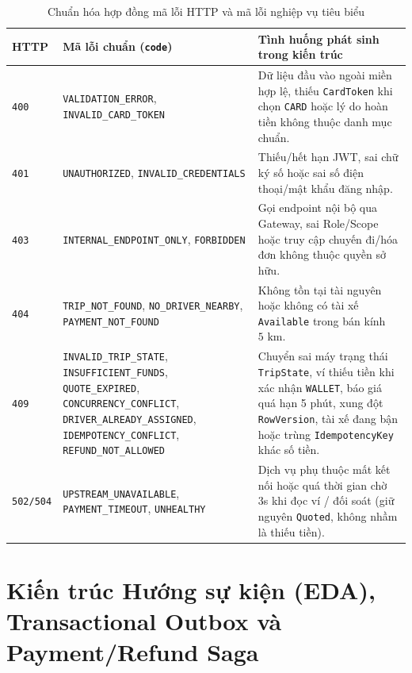 \documentclass[12pt,a4paper]{article}
\newcommand{\ab}{\allowbreak}
\begin{document}
{\footnotesize
\renewcommand{\arraystretch}{1.20}
\begin{table}[htbp]
\centering
\caption{Chuẩn hóa hợp đồng mã lỗi HTTP và mã lỗi nghiệp vụ tiêu biểu}
\label{tab:error-codes}
\begin{tabularx}{\textwidth}{C{1.4cm} L{4.9cm} Y}
\toprule
\textbf{HTTP} & \textbf{Mã lỗi chuẩn (\texttt{code})} & \textbf{Tình huống phát sinh trong kiến trúc} \\
\midrule
\texttt{400} & \texttt{VALIDATION\_ERROR}, \texttt{INVALID\_CARD\_TOKEN} & Dữ liệu đầu vào ngoài miền hợp lệ, thiếu \texttt{CardToken} khi chọn \texttt{CARD} hoặc lý do hoàn tiền không thuộc danh mục chuẩn. \\
\texttt{401} & \texttt{UNAUTHORIZED}, \texttt{INVALID\_CREDENTIALS} & Thiếu/hết hạn JWT, sai chữ ký số hoặc sai số điện thoại/mật khẩu đăng nhập. \\
\texttt{403} & \texttt{INTERNAL\_ENDPOINT\_ONLY}, \texttt{FORBIDDEN} & Gọi endpoint nội bộ qua Gateway, sai Role/Scope hoặc truy cập chuyến đi/hóa đơn không thuộc quyền sở hữu. \\
\texttt{404} & \texttt{TRIP\_NOT\_FOUND}, \texttt{NO\_DRIVER\_NEARBY}, \texttt{PAYMENT\_NOT\_FOUND} & Không tồn tại tài nguyên hoặc không có tài xế \texttt{Available} trong bán kính $5\text{ km}$. \\
\texttt{409} & \texttt{INVALID\_TRIP\_STATE}, \texttt{INSUFFICIENT\_\ab FUNDS}, \texttt{QUOTE\_EXPIRED}, \texttt{CONCURRENCY\_\ab CONFLICT}, \texttt{DRIVER\_ALREADY\_\ab ASSIGNED}, \texttt{IDEMPOTENCY\_CONFLICT}, \texttt{REFUND\_NOT\_ALLOWED} & Chuyển sai máy trạng thái \texttt{TripState}, ví thiếu tiền khi xác nhận \texttt{WALLET}, báo giá quá hạn 5 phút, xung đột \texttt{RowVersion}, tài xế đang bận hoặc trùng \texttt{IdempotencyKey} khác số tiền. \\
\texttt{502/504} & \texttt{UPSTREAM\_UNAVAILABLE}, \texttt{PAYMENT\_\ab TIMEOUT}, \texttt{UNHEALTHY} & Dịch vụ phụ thuộc mất kết nối hoặc quá thời gian chờ 3s khi đọc ví / đối soát (giữ nguyên \texttt{Quoted}, không nhầm là thiếu tiền). \\
\bottomrule
\end{tabularx}
\end{table}
\renewcommand{\arraystretch}{1.0}
}

\section{Kiến trúc Hướng sự kiện (EDA), Transactional Outbox và Payment/Refund Saga}
\end{document}
